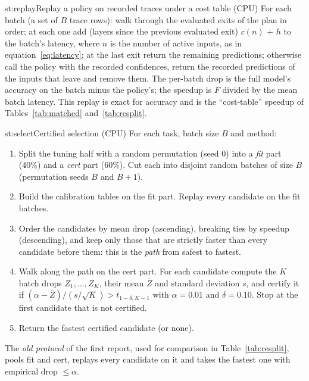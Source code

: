 \begin{step}{st:replay}{Replay a policy on recorded traces under a cost table (CPU)}
For each batch (a set of $B$ trace rows): walk through the evaluated exits of the plan in order; at each one add
(layers since the previous evaluated exit) \x{} $c(n)$ + $h$ to the batch's latency, where $n$ is the number of
active inputs, as in equation~\eqref{eq:latency}; at the last exit return the remaining predictions; otherwise call
the policy with the recorded confidences, return the recorded predictions of the inputs that leave and remove them.
The per-batch drop is the full model's accuracy on the batch minus the policy's; the speedup is $F$ divided by the
mean batch latency. This replay is exact for accuracy and is the ``cost-table'' speedup of Tables~\ref{tab:matched}
and~\ref{tab:resplit}.
\end{step}

\begin{step}{st:select}{Certified selection (CPU)}
For each task, batch size $B$ and method:
\begin{enumerate}
  \item Split the tuning half with a random permutation (seed 0) into a \emph{fit} part (40\%) and a \emph{cert}
  part (60\%). Cut each into disjoint random batches of size $B$ (permutation seeds $B$ and $B+1$).
  \item Build the calibration tables on the fit part. Replay every candidate on the fit batches.
  \item Order the candidates by mean drop (ascending), breaking ties by speedup (descending), and keep only those that
  are strictly faster than every candidate before them: this is the \emph{path} from safest to fastest.
  \item Walk along the path on the cert part. For each candidate compute the $K$ batch drops $Z_1,\dots,Z_K$, their
  mean $\bar Z$ and standard deviation $s$, and certify it if $(\alpha-\bar Z)/(s/\sqrt K) > t_{1-\delta,K-1}$ with
  $\alpha=0.01$ and $\delta=0.10$. Stop at the first candidate that is not certified.
  \item Return the fastest certified candidate (or none).
\end{enumerate}
The \emph{old protocol} of the first report, used for comparison in Table~\ref{tab:resplit}, pools fit and cert,
replays every candidate on it and takes the fastest one with empirical drop $\le\alpha$.
\end{step}

